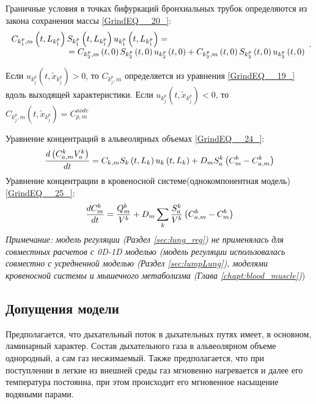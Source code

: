 Граничные условия в точках бифуркаций бронхиальных трубок определяются из закона сохранения массы \eqref{GrindEQ__20_}:
\begin{equation} 
\begin{array}{l} {C_{k_{1}^{p} ,m} \left(t,L_{k_{1}^{p} } \right)S_{k_{1}^{p} } \left(t,L_{k_{1}^{p} } \right)u_{k_{1}^{p} } \left(t,L_{k_{1}^{p} } \right)=} \\ {\; \; \; \; \; \; \; \; \; \; \; \; \; \; \; \; \; \; \; \; \; \; \; \; =C_{k_{2}^{p} ,m} \left(t,0\right)S_{k_{2}^{p} } \left(t,0\right)u_{k_{2}^{p} } \left(t,0\right)+C_{k_{3}^{p} ,m} \left(t,0\right)S_{k_{3}^{p} } \left(t,0\right)u_{k_{3}^{p} } \left(t,0\right)} \end{array}.  \notag 
\end{equation} 

Если $u_{k_{j}^{p} } \left(t,\tilde{x}_{k_{j}^{p} } \right)>0$, то $C_{k_{j}^{p} ,m} $ определяется из уравнения \eqref{GrindEQ__19_} вдоль выходящей характеристики. Если $u_{k_{j}^{p} } \left(t,\tilde{x}_{k_{j}^{p} } \right)<0$, то $ C_{k_{j}^{p} ,m} \left(t,\tilde{x}_{k_{j}^{p} } \right)=C_{p,m}^{node}$ 



Уравнение концентраций в альвеолярных объемах \eqref{GrindEQ__24_}:
\begin{equation}  
\frac{d\left(C_{a,m}^{k} V_{a}^{k} \right)}{dt} =C_{k,m} S_{k} \left(t,L_{k} \right)u_{k} \left(t,L_{k} \right)+D_{m} S_{a}^{k} \left(C_{m}^{b} -C_{a,m}^{k} \right)\notag  
\end{equation} 
Уравнение концентрации в кровеносной системе(однокомпонентная модель) \eqref{GrindEQ__25_}:
\begin{equation} 
\frac{dC_{m}^{b} }{dt} =\frac{Q_{m}^{b} }{V^{b} } +D_{m} \sum _{k}\frac{S_{a}^{k} }{V^{b} } \left(C_{a,m}^{k} -C_{m}^{b} \right)\notag  
\end{equation}
\textit{Примечание: модель регуляции (Раздел \ref{sec:lung_reg}) не применялась для совместных расчетов с 0D-1D моделью (модель регуляции использовалась совместно с усредненной моделью (Раздел \ref{sec:lumpLung}), моделями кровеносной системы и мышечного метаболизма (Глава \ref{chapt:blood_muscle})})

\subsection{Допущения модели}
Предполагается, что дыхательный поток в дыхательных путях имеет, в основном, ламинарный характер. Состав дыхательного газа в альвеолярном объеме однородный, а сам газ несжимаемый. Также предполагается, что при поступлении в легкие из внешней среды газ мгновенно нагревается и далее его температура постоянна, при этом происходит его мгновенное насыщение водяными парами.   

